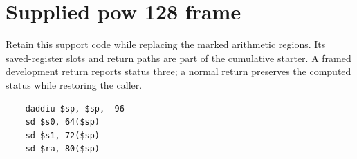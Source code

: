 \section{Supplied pow 128 frame}
Retain this support code while replacing the marked arithmetic regions. Its saved-register slots and return paths are part of the cumulative starter. A framed development return reports status three; a normal return preserves the computed status while restoring the caller.

\begin{verbatim}
    daddiu $sp, $sp, -96
    sd $s0, 64($sp)
    sd $s1, 72($sp)
    sd $ra, 80($sp)
\end{verbatim}

